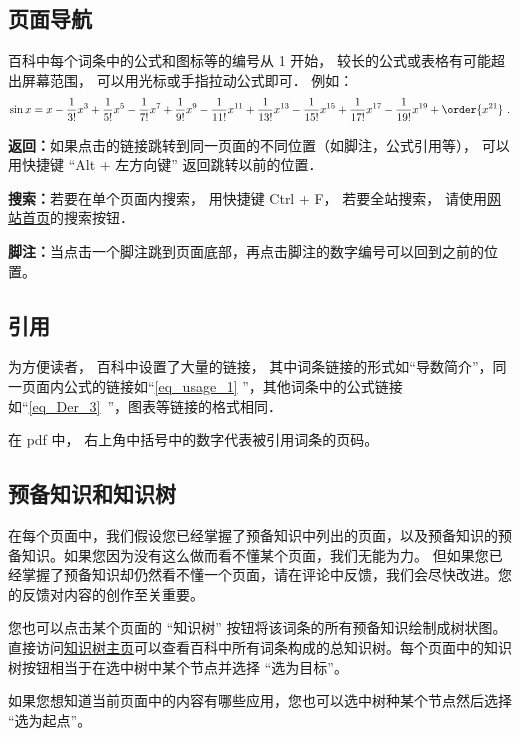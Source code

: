 
\subsection{页面导航}
百科中每个词条中的公式和图标等的编号从 1 开始， 较长的公式或表格有可能超出屏幕范围， 可以用光标或手指拉动公式即可． 例如：
\begin{equation}\label{eq_usage_1}
\sin x = x - \frac{1}{3!} x^3 + \frac{1}{5!} x^5 - \frac{1}{7!} x^7+\frac{1}{9!} x^9-\frac{1}{11!} x^{11}+\frac{1}{13!} x^{13}-\frac{1}{15!} x^{15}+\frac{1}{17!} x^{17}-\frac{1}{19!} x^{19}+ \order{x^{21}}~.
\end{equation}

\textbf{返回：}如果点击的链接跳转到同一页面的不同位置（如脚注，公式引用等）， 可以用快捷键 “Alt + 左方向键” 返回跳转以前的位置．

\textbf{搜索：}若要在单个页面内搜索， 用快捷键 Ctrl + F， 若要全站搜索， 请使用\href{https://wuli.wiki}{网站首页}的搜索按钮．

\textbf{脚注：}当点击一个脚注跳到页面底部，再点击脚注的数字编号可以回到之前的位置。

\subsection{引用}
为方便读者， 百科中设置了大量的链接， 其中词条链接的形式如“导数简介”，同一页面内公式的链接如“\autoref{eq_usage_1} ”，其他词条中的公式链接如“\autoref{eq_Der_3}~”，图表等链接的格式相同．

在 pdf 中， 右上角中括号中的数字代表被引用词条的页码。

\subsection{预备知识和知识树}
在每个页面中，我们假设您已经掌握了预备知识中列出的页面，以及预备知识的预备知识。如果您因为没有这么做而看不懂某个页面，我们无能为力。 但如果您已经掌握了预备知识却仍然看不懂一个页面，请在评论中反馈，我们会尽快改进。您的反馈对内容的创作至关重要。

您也可以点击某个页面的 “知识树” 按钮将该词条的所有预备知识绘制成树状图。 直接访问\href{https://wuli.wiki/tree/}{知识树主页}可以查看百科中所有词条构成的总知识树。每个页面中的知识树按钮相当于在选中树中某个节点并选择 “选为目标”。

如果您想知道当前页面中的内容有哪些应用，您也可以选中树种某个节点然后选择 “选为起点”。
